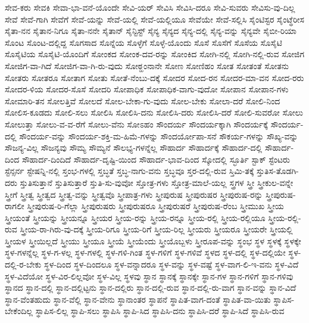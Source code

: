 {ಸೇವ-ಕರು
ಸೇವಕಿ
ಸೇವಾ-ಭಾ-ವನೆ-ಯೊಂದೇ
ಸೇವಿ-ಯರ್
ಸೇವಿಸಿ
ಸೇವಿಸಿ-ದರೂ
ಸೇವಿ-ಸುವರು
ಸೇವಿಸು-ವು-ದಿಲ್ಲ
ಸೇವೆ
ಸೇವೆ-ಗಾಗಿ
ಸೇವೆಗೆ
ಸೇವೆ-ಯನ್ನು
ಸೇವೆ-ಯಲ್ಲಿ
ಸೇವೆ-ಯಲ್ಲಿಯೂ
ಸೇವೆಯೇ
ಸೇವೆ-ಸಲ್ಲಿಸಿ
ಸೈಂಟಿಸ್ಟರ
ಸೈಂಟ್ಥೆರೀಸ
ಸೈತಾ-ನನ
ಸೈತಾನ-ನಿಗೂ
ಸೈತಾ-ನನೇ
ಸೈತಾನ್
ಸೈನ್ಟಿಸ್ಟ್
ಸೈನ್ಯ
ಸೈನ್ಯದ
ಸೈನ್ಯ-ದಲ್ಲಿ
ಸೈನ್ಯ-ವನ್ನು
ಸೈನ್ಯವೇ
ಸೈಬೀ-ರಿಯಾ
ಸೊಂಟ
ಸೊಂಟ-ದಲ್ಲಿದ್ದ
ಸೊಗಸಾದ
ಸೊನ್ನೆಯ
ಸೊಳ್ಳೆಗೆ
ಸೊಳ್ಳೆ-ಯೊಂದು
ಸೊಸೆ
ಸೊಸೆಗೆ
ಸೊಸೆಯ
ಸೊಸೈಟಿ
ಸೊಸೈಟಿಯ
ಸೊಸೈಟಿ-ಯೊಂದಿಗೆ
ಸೋಂಕದ
ಸೋಂಕ-ದವ-ರನ್ನು
ಸೋಂಕಿದ
ಸೋಗಿ-ನಲ್ಲಿ
ಸೋಗಿ-ನಲ್ಲಿ-ರುವ
ಸೋಜಿಗ
ಸೋಜಿಗ-ವಾ-ಗಿದೆ
ಸೋಜಿಗ-ವಾ-ಗಿ-ರು-ವುದು
ಸೋಠ್ಹಂನಾನೇ
ಸೋಣ
ಸೋಣಿಹಂ
ಸೋತ
ಸೋತಂತೆ
ಸೋತನು
ಸೋತರು
ಸೋತರೂ
ಸೋತಾಗ
ಸೋತು
ಸೋತೆ-ನೆಂಬು-ದಕ್ಕೆ
ಸೋದರ
ಸೋದ-ರನ
ಸೋದರ-ಮಾ-ವನ
ಸೋದ-ರರು
ಸೋದರ-ಳಿಯ
ಸೋದರ-ಸೊಸೆ
ಸೋದರಿ
ಸೋಪಾಧಿಕ
ಸೋಪಾಧಿಕ-ವಾಗು-ವುದೋ
ಸೋಪಾನ
ಸೋಪಾನ-ಗಳು
ಸೋಮಾರಿ-ತನ
ಸೋಲತ್ತಿವೆ
ಸೋಲದೆ
ಸೋಲ-ಬೇಕಾ-ಗು-ವುದು
ಸೋಲ-ಬೇಕು
ಸೋಲಾ-ದರೆ
ಸೋಲಿ-ನಿಂದ
ಸೋಲಿಸ-ಕೂಡದು
ಸೋಲಿ-ಸಲು
ಸೋಲಿಸಿ
ಸೋಲಿಸಿ-ದನು
ಸೋಲಿಸಿ-ದರು
ಸೋಲಿಸಿ-ದರೆ
ಸೋಲಿ-ಸುವರೋ
ಸೋಲು
ಸೋಲುತ್ತಾ
ಸೋಲು-ವ-ವ-ರೆಗೆ
ಸೋಲು-ವೆನು
ಸೋಽಹಂ
ಸೌಂದರ್ಯ
ಸೌಂದರ್ಯಕ್ಕಾಗಿ
ಸೌಂದರ್ಯಕ್ಕೆ
ಸೌಂದರ್ಯ-ದಲ್ಲಿ
ಸೌಂದರ್ಯ-ವನ್ನು
ಸೌಂದರ್ಯ-ಶಕ್ತಿ-ಮ-ಹಿಮೆ-ಗಳನ್ನು
ಸೌಂದರ್ಯೋಪಾ-ಸನೆ
ಸೌಕರ್ಯ-ಗಳನ್ನು
ಸೌಖ್ಯ-ವನ್ನು
ಸೌಜನ್ಯ-ವಿಲ್ಲ
ಸೌಜನ್ಯವು
ಸೌಮ್ಯ
ಸೌಮ್ಯನೆ
ಸೌಲಭ್ಯ-ಗಳನ್ನೆಲ್ಲ
ಸೌಹಾರ್ದ
ಸೌಹಾರ್ದಕ್ಕೆ
ಸೌಹಾರ್ದ-ದಲ್ಲಿ
ಸೌಹಾರ್ದ-ದಿಂದ
ಸೌಹಾರ್ದ-ದಿಂದಿದೆ
ಸೌಹಾರ್ದ-ದೃಷ್ಟಿ-ಯಿಂದ
ಸೌಹಾರ್ದ-ಭಾವ-ದಿಂದ
ಸ್ಕೋದಲ್ಲಿ
ಸ್ಛೂರ್ತಿ
ಸ್ಟಾಕ್
ಸ್ಟೆಂಟರು
ಸ್ಟೆನ್ಸರ್ನ
ಸ್ಟೇಷನ್ನಿ-ನಲ್ಲಿ
ಸ್ತಂಭ-ಗಳಲ್ಲಿ
ಸ್ತಬ್ಧತೆ
ಸ್ತಬ್ಧ-ನಾಗು-ವನು
ಸ್ತಬ್ಧವೂ
ಸ್ತರ-ದಲ್ಲಿ-ರುವ
ಸ್ತಿಮಿ-ತಕ್ಕೆ
ಸ್ತುತಿಸ-ತೊಡಗಿ-ದರು
ಸ್ತುತಿಸುತ್ತಾನೆ
ಸ್ತುತಿಸುತ್ತಾರೆ
ಸ್ತುತಿ-ಸು-ವುವೋ
ಸ್ತೋತ್ರ-ಗಳು
ಸ್ತೋತ್ರ-ಮಾಲೆ-ಯಲ್ಲ
ಸ್ತ್ರಗಳ
ಸ್ತ್ರೀ
ಸ್ತ್ರೀಕುಲ-ವನ್ನೇ
ಸ್ತ್ರೀಗೆ
ಸ್ತ್ರೀತ್ವ
ಸ್ತ್ರೀತ್ವದ
ಸ್ತ್ರೀತ್ವ-ವನ್ನು
ಸ್ತ್ರೀತ್ವವೊ
ಸ್ತ್ರೀಪಾತ್ರ-ಗಳು
ಸ್ತ್ರೀಪುರುಷ
ಸ್ತ್ರೀಪುರುಷರ
ಸ್ತ್ರೀಪುರುಷ-ರನ್ನು
ಸ್ತ್ರೀಪುರುಷ-ರಾಗಲೀ
ಸ್ತ್ರೀಪುರುಷ-ರಿ-ಗೆಲ್ಲಾ
ಸ್ತ್ರೀಪುರುಷರು
ಸ್ತ್ರೀಪುರುಷರೂ
ಸ್ತ್ರೀಪುರುಷರೆ
ಸ್ತ್ರೀಪುರುಷ-ರೆಂಬ
ಸ್ತ್ರೀಮುಖ
ಸ್ತ್ರೀಯ
ಸ್ತ್ರೀಯಂತೆ
ಸ್ತ್ರೀಯನ್ನು
ಸ್ತ್ರೀಯನ್ನೂ
ಸ್ತ್ರೀಯರ
ಸ್ತ್ರೀಯ-ರನ್ನು
ಸ್ತ್ರೀಯ-ರನ್ನೂ
ಸ್ತ್ರೀಯ-ರಲ್ಲಿ
ಸ್ತ್ರೀಯ-ರಲ್ಲಿಯೂ
ಸ್ತ್ರೀಯ-ರಲ್ಲಿ-ರುವ
ಸ್ತ್ರೀಯ-ರಾ-ಗಿರು-ವು-ದಕ್ಕೆ
ಸ್ತ್ರೀಯ-ರಿಗೂ
ಸ್ತ್ರೀಯ-ರಿಗೆ
ಸ್ತ್ರೀಯ-ರಿಲ್ಲ
ಸ್ತ್ರೀಯರು
ಸ್ತ್ರೀಯರೂ
ಸ್ತ್ರೀಯರೇ
ಸ್ತ್ರೀಯಲ್ಲಿ
ಸ್ತ್ರೀಯಳ
ಸ್ತ್ರೀಯಿಲ್ಲದೆ
ಸ್ತ್ರೀಯು
ಸ್ತ್ರೀಯೂ
ಸ್ತ್ರೀಯೆ
ಸ್ತ್ರೀಯೆಂದು
ಸ್ತ್ರೀಯೊಬ್ಬಳು
ಸ್ತ್ರೀರೂಪ-ವನ್ನು
ಸ್ಥಂಭ
ಸ್ಥಳ
ಸ್ಥಳಕ್ಕೆ
ಸ್ಥಳಕ್ಕೇ
ಸ್ಥಳ-ಗಳನ್ನೆಲ್ಲ
ಸ್ಥಳ-ಗ-ಳಲ್ಲ
ಸ್ಥಳ-ಗಳಲ್ಲಿ
ಸ್ಥಳ-ಗಳಿ-ಗಿಂತ
ಸ್ಥಳ-ಗಳಿಗೆ
ಸ್ಥಳ-ಗಳಿವೆ
ಸ್ಥಳದ
ಸ್ಥಳ-ದಲ್ಲಿ
ಸ್ಥಳ-ದಲ್ಲಿಯೇ
ಸ್ಥಳ-ದಲ್ಲಿ-ರ-ಬೇಕು
ಸ್ಥಳ-ದಿಂದ
ಸ್ಥಳ-ದಿಂದಲೂ
ಸ್ಥಳ-ವನ್ನಾದರೂ
ಸ್ಥಳ-ವನ್ನು
ಸ್ಥಳ-ವಷ್ಟೆ
ಸ್ಥಳ-ವಾಗ-ಲಿ-ಇ-ವನು
ಸ್ಥಳ-ವಿದೆ
ಸ್ಥಳ-ವಿದೆಯೋ
ಸ್ಥಳ-ವಿರ-ಲಿಲ್ಲವೋ
ಸ್ಥಳ-ವಿಲ್ಲ
ಸ್ಥಳವು
ಸ್ಥಾನ
ಸ್ಥಾನಕ್ಕೆ
ಸ್ಥಾನಕ್ಕೇ
ಸ್ಥಾನ-ಗಳ
ಸ್ಥಾನ-ಗಳಿಗೆ
ಸ್ಥಾನ-ಗಳಿವು
ಸ್ಥಾನದ
ಸ್ಥಾನ-ದಲ್ಲಿ
ಸ್ಥಾನ-ದಲ್ಲಿಟ್ಟನು
ಸ್ಥಾನ-ದಲ್ಲಿರು
ಸ್ಥಾನ-ದಲ್ಲಿ-ರುವ
ಸ್ಥಾನ-ದಲ್ಲಿ-ರು-ವಾಗ
ಸ್ಥಾನ-ವನ್ನು
ಸ್ಥಾನ-ವಿದೆ
ಸ್ಥಾನ-ವೆಂತಹುದು
ಸ್ಥಾನ-ವೆಲ್ಲಿ
ಸ್ಥಾನ-ವೇನು
ಸ್ಥಾನಾಂತರ
ಸ್ಥಾಪನೆ
ಸ್ಥಾಪಿತ-ವಾಗ-ದಂತೆ
ಸ್ಥಾಪಿತ-ವಾ-ಯಿತು
ಸ್ಥಾಪಿಸ-ಬೇಕೆಂದಿಲ್ಲ
ಸ್ಥಾಪಿಸ-ಲಿಲ್ಲ
ಸ್ಥಾಪಿ-ಸಲು
ಸ್ಥಾಪಿಸಿ
ಸ್ಥಾಪಿ-ಸಿದ
ಸ್ಥಾಪಿಸಿ-ದನು
ಸ್ಥಾಪಿಸಿ-ದರೆ
ಸ್ಥಾಪಿ-ಸಿದೆ
ಸ್ಥಾಪಿಸಿ-ರುವ
}
